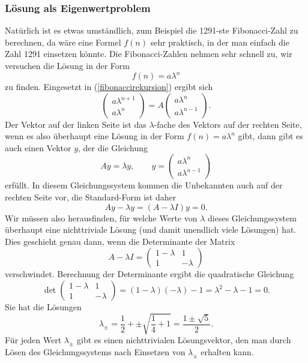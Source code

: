 \subsubsection{Lösung als Eigenwertproblem}
Natürlich ist es etwas umständlich, zum Beispiel die 1291-ste Fibonacci-Zahl
zu berechnen, da wäre eine Formel $f(n)$ sehr praktisch, in der man einfach
die Zahl 1291 einsetzen könnte.
Die Fibonacci-Zahlen nehmen sehr schnell zu,
wir versuchen die Lösung in der Form
\[
f(n)=a\lambda^n
\]
zu finden. Eingesetzt in (\ref{fibonaccirekursion}) ergibt sich
\[
\begin{pmatrix}a\lambda^{n+1}\\a\lambda^n\end{pmatrix}
=A\begin{pmatrix}a\lambda^n\\a\lambda^{n-1}\end{pmatrix}.
\]
Der Vektor auf der linken Seite ist das $\lambda$-fache des Vektors
auf der rechten Seite, wenn es also überhaupt eine Lösung in der
Form $f(n)=a\lambda^n$ gibt, dann gibt es auch einen Vektor $y$, der
die Gleichung
\begin{equation}
Ay=\lambda y, \qquad y=\begin{pmatrix}
a\lambda^n\\a\lambda^{n-1}
\end{pmatrix}
\end{equation}
erfüllt. In diesem Gleichungssystem kommen die Unbekannten auch auf
der rechten Seite vor, die Standard-Form ist daher
\[
Ay-\lambda y=(A-\lambda I)y=0.
\]
Wir müssen also herausfinden, für welche Werte von $\lambda$ dieses
Gleichungssystem überhaupt eine nichttriviale Lösung (und damit unendlich
viele Lösungen) hat.
Dies geschieht genau dann, wenn die Determinante der Matrix
\[
A-\lambda I=\begin{pmatrix}1-\lambda&1\\1&-\lambda\end{pmatrix}
\]
verschwindet.
Berechnung der Determinante ergibt die quadratische Gleichung
\[
\det
\begin{pmatrix}1-\lambda&1\\1&-\lambda\end{pmatrix}
=(1-\lambda)(-\lambda)-1=\lambda^2-\lambda-1=0.
\]
Sie hat die Lösungen
\[
\lambda_{\pm}=\frac12+\pm\sqrt{\frac14+1}=\frac{1\pm\sqrt{5}}2.
\]
Für jeden Wert $\lambda_{\pm}$ gibt es einen nichttrivialen
Lösungsvektor, den man durch Lösen des Gleichungssystems nach
Einsetzen von $\lambda_{\pm}$ erhalten kann.

